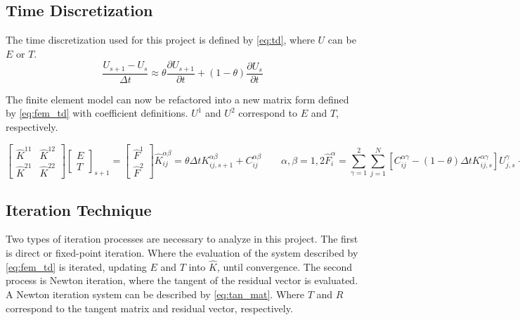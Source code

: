 \documentclass[11pt]{scrartcl}
\newcommand{\be}{\begin{equation}}
\newcommand{\ee}{\end{equation}}
\begin{document}
\subsection{\bf Time Discretization}

The time discretization used for this project is defined by \eqref{eq:td}, where $U$ can be $E$ or $T$.
\be
\frac{U_{s+1}-U_s}{\Delta t} \approx \theta\frac{\partial U_{s+1}}{\partial t} + (1-\theta)\frac{\partial U_{s}}{\partial t}
\label{eq:td}
\ee

The finite element model can now be refactored into a new matrix form defined by \eqref{eq:fem_td} with coefficient definitions.  $U^1$ and $U^2$ correspond to $E$ and $T$, respectively.

\begin{subequations}

\be
\begin{bmatrix} \hat{K}^{11} & \hat{K}^{12} \\ \hat{K}^{21} & \hat{K}^{22} \end{bmatrix}
\begin{bmatrix} E \\ T \end{bmatrix}_{s+1} =
\begin{bmatrix} \hat{F}^1 \\ \hat{F}^2 \end{bmatrix}
\ee
\be 
\hat{K}^{\alpha\beta}_{ij} = \theta\Delta t K^{\alpha\beta}_{ij,s+1} + C^{\alpha\beta}_{ij} \qquad \alpha,\beta = 1,2
\ee
\be 
\hat{F}^{\alpha}_{i} = \sum_{\gamma=1}^2\sum_{j=1}^N\left[C^{\alpha\gamma}_{ij}-(1-\theta)\Delta tK^{\alpha\gamma}_{ij,s}\right]U^{\gamma}_{j,s} + \Delta t \left[\theta F^{\alpha}_{i,s+1}+(1-\theta)F^{\alpha}_{i,s}\right] \qquad \alpha=1,2
\ee

\label{eq:fem_td}
\end{subequations}

\subsection{\bf Iteration Technique}

Two types of iteration processes are necessary to analyze in this project. The first is direct or fixed-point iteration. Where the evaluation of the system described by \eqref{eq:fem_td} is iterated, updating $E$ and $T$ into $\hat{K}$, until convergence.  The second process is Newton iteration, where the tangent of the residual vector is evaluated.  A Newton iteration system can be described by \eqref{eq:tan_mat}. Where $T$ and $R$ correspond to the tangent matrix and residual vector, respectively.
\end{document}
